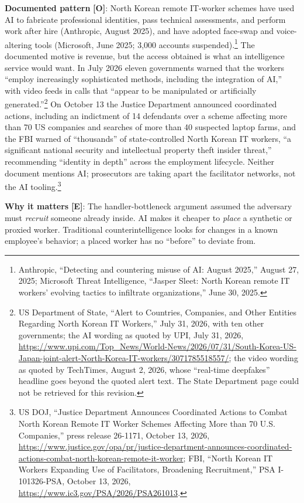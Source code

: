 \documentclass[11pt,letterpaper]{article}
\begin{document}
\textbf{Documented pattern} \textbf{[O]}: North Korean remote IT-worker schemes have used AI to fabricate professional identities, pass technical assessments, and perform work after hire (Anthropic, August 2025), and have adopted face-swap and voice-altering tools (Microsoft, June 2025; 3,000 accounts suspended).\footnote{Anthropic, ``Detecting and countering misuse of AI: August 2025,'' August 27, 2025; Microsoft Threat Intelligence, ``Jasper Sleet: North Korean remote IT workers' evolving tactics to infiltrate organizations,'' June 30, 2025.} The documented motive is revenue, but the access obtained is what an intelligence service would want. In July 2026 eleven governments warned that the workers ``employ increasingly sophisticated methods, including the integration of AI,'' with video feeds in calls that ``appear to be manipulated or artificially generated.''\footnote{US Department of State, ``Alert to Countries, Companies, and Other Entities Regarding North Korean IT Workers,'' July 31, 2026, with ten other governments; the AI wording as quoted by UPI, July 31, 2026, \url{https://www.upi.com/Top_News/World-News/2026/07/31/South-Korea-US-Japan-joint-alert-North-Korea-IT-workers/3071785518557/}; the video wording as quoted by TechTimes, August 2, 2026, whose ``real-time deepfakes'' headline goes beyond the quoted alert text. The State Department page could not be retrieved for this revision.} On October 13 the Justice Department announced coordinated actions, including an indictment of 14 defendants over a scheme affecting more than 70 US companies and searches of more than 40 suspected laptop farms, and the FBI warned of ``thousands'' of state-controlled North Korean IT workers, ``a significant national security and intellectual property theft insider threat,'' recommending ``identity in depth'' across the employment lifecycle. Neither document mentions AI; prosecutors are taking apart the facilitator networks, not the AI tooling.\footnote{US DOJ, ``Justice Department Announces Coordinated Actions to Combat North Korean Remote IT Worker Schemes Affecting More than 70 U.S. Companies,'' press release 26-1171, October 13, 2026, \url{https://www.justice.gov/opa/pr/justice-department-announces-coordinated-actions-combat-north-korean-remote-it-worker}; FBI, ``North Korean IT Workers Expanding Use of Facilitators, Broadening Recruitment,'' PSA I-101326-PSA, October 13, 2026, \url{https://www.ic3.gov/PSA/2026/PSA261013}.}

\textbf{Why it matters} \textbf{[E]}: The handler-bottleneck argument assumed the adversary must \textit{recruit} someone already inside. AI makes it cheaper to \textit{place} a synthetic or proxied worker. Traditional counterintelligence looks for changes in a known employee's behavior; a placed worker has no ``before'' to deviate from.
\end{document}
